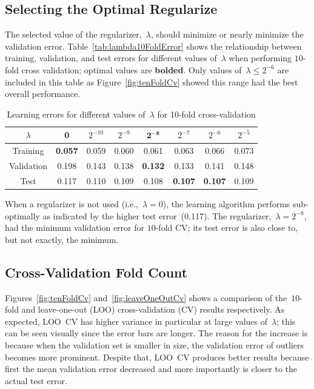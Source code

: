 \documentclass{report}
\begin{document}
  \subsection{Selecting the Optimal Regularize}\label{sec:selectOptimalRegularizer}
  
  The selected value of the regularizer,~$\lambda$, should minimize or nearly minimize the validation error.  Table~\ref{tab:lambda10FoldError} shows the relationship between training, validation, and test errors for different values of~$\lambda$ when performing $10$-fold cross validation; optimal values are \textbf{bolded}.   Only values of~$\lambda \leq 2^{-6}$ are included in this table as Figure~\ref{fig:tenFoldCv} showed this range had the best overall performance.
  
  \begin{table}[b]
    \centering
    \caption{Learning errors for different values of~$\lambda$ for 10-fold cross-validation}\label{tab:lambda10FoldError}
    \label{my-label}
    \begin{tabular}{c||c|c|c|c|c|c|c}
      \hline
      $\lambda$  & 0     & $2^{-10}$ & $2^{-9}$ & $\mathbf{2^{-8}}$ & $2^{-7}$ & $2^{-6}$ & $2^{-5}$ \\ \hline\hline
      Training   & \textbf{0.057} & 0.059     & 0.060    & 0.061    & 0.063    & 0.066    & 0.073    \\ \hline
      Validation & 0.198 & 0.143     & 0.138    & \textbf{0.132}    & 0.133    & 0.141    & 0.148    \\ \hline
      Test       & 0.117 & 0.110     & 0.109    & 0.108    & \textbf{0.107}    & \textbf{0.107}    & 0.109    \\ \hline
    \end{tabular}
  \end{table}
  
  When a regularizer is not used (i.e.,~$\lambda=0$), the learning algorithm performs sub-optimally as indicated by the higher test error~(0.117). The regularizer,~$\lambda=2^{-8}$, had the minimum validation error for $10$-fold CV; its test error is also close to, but not exactly, the minimum.
  
  \subsection{Cross-Validation Fold Count}\label{sec:cvFoldCount}
  
  Figures~\ref{fig:tenFoldCv} and~\ref{fig:leaveOneOutCv} shows a comparison of the~$10$-fold and leave-one-out (LOO) cross-validation (CV) results respectively.  As expected, LOO~CV has higher variance in particular at large values of~$\lambda$; this can be seen visually since the error bars are longer.  The reason for the increase is because when the validation set is smaller in size, the validation error of outliers becomes more prominent.  Despite that, LOO~CV produces better results because first the mean validation error decreased and more importantly is closer to the actual test error.
  
\end{document}
